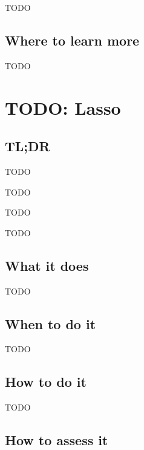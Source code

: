 \documentclass[
]{book}
\providecommand{\tightlist}{%
  \setlength{\itemsep}{0pt}\setlength{\parskip}{0pt}}
\begin{document}
TODO

\hypertarget{where-to-learn-more-12}{%
\section{Where to learn more}\label{where-to-learn-more-12}}

TODO

\hypertarget{lasso}{%
\chapter{TODO: Lasso}\label{lasso}}

\hypertarget{tldr-13}{%
\section{TL;DR}\label{tldr-13}}

\begin{description}
\tightlist
\item[What it does]
TODO
\item[When to do it]
TODO
\item[How to do it]
TODO
\item[How to assess it]
TODO
\end{description}

\hypertarget{what-it-does-13}{%
\section{What it does}\label{what-it-does-13}}

TODO

\hypertarget{when-to-do-it-13}{%
\section{When to do it}\label{when-to-do-it-13}}

TODO

\hypertarget{how-to-do-it-13}{%
\section{How to do it}\label{how-to-do-it-13}}

TODO

\hypertarget{how-to-assess-it-13}{%
\section{How to assess it}\label{how-to-assess-it-13}}
\end{document}
